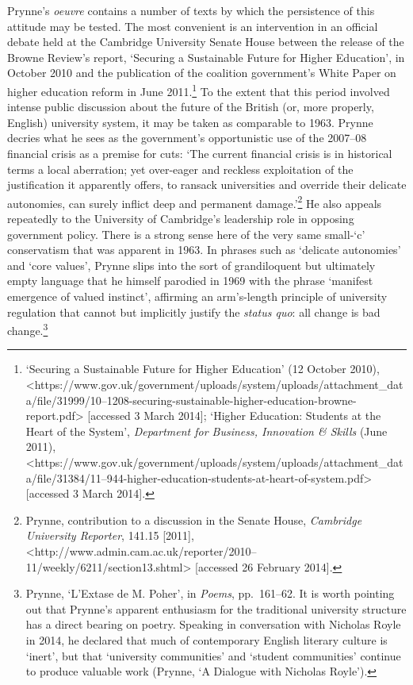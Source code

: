 \documentclass[]{article}
\begin{document}
Prynne's \emph{oeuvre} contains a number of texts by which the
persistence of this attitude may be tested. The most convenient is an
intervention in an official debate held at the Cambridge University
Senate House between the release of the Browne Review's report,
`Securing a Sustainable Future for Higher Education', in October 2010
and the publication of the coalition government's White Paper on higher
education reform in June 2011.\footnote{`Securing a Sustainable Future
  for Higher Education' (12 October 2010),
  \textless{}https://www.gov.uk/government/uploads/system/uploads/attachment\_data/file/31999/10--1208-securing-sustainable-higher-education-browne-report.pdf\textgreater{}
  {[}accessed 3 March 2014{]}; `Higher Education: Students at the Heart
  of the System', \emph{Department for Business, Innovation \& Skills}
  (June 2011),
  \textless{}https://www.gov.uk/government/uploads/system/uploads/attachment\_data/file/31384/11--944-higher-education-students-at-heart-of-system.pdf\textgreater{}
  {[}accessed 3 March 2014{]}.} To the extent that this period involved
intense public discussion about the future of the British (or, more
properly, English) university system, it may be taken as comparable to
1963. Prynne decries what he sees as the government's opportunistic use
of the 2007--08 financial crisis as a premise for cuts: `The current
financial crisis is in historical terms a local aberration; yet
over-eager and reckless exploitation of the justification it apparently
offers, to ransack universities and override their delicate autonomies,
can surely inflict deep and permanent damage.'\footnote{Prynne,
  contribution to a discussion in the Senate House, \emph{Cambridge
  University Reporter}, 141.15 {[}2011{]},
  \textless{}http://www.admin.cam.ac.uk/reporter/2010--11/weekly/6211/section13.shtml\textgreater{}
  {[}accessed 26 February 2014{]}.} He also appeals repeatedly to the
University of Cambridge's leadership role in opposing government policy.
There is a strong sense here of the very same small-`c' conservatism
that was apparent in 1963. In phrases such as `delicate autonomies' and
`core values', Prynne slips into the sort of grandiloquent but
ultimately empty language that he himself parodied in 1969 with the
phrase `manifest emergence \textbar{} of valued instinct', affirming an
arm's-length principle of university regulation that cannot but
implicitly justify the \emph{status quo}: all change is bad
change.\footnote{Prynne, `L'Extase de M. Poher', in \emph{Poems},
  pp.~161--62. It is worth pointing out that Prynne's apparent
  enthusiasm for the traditional university structure has a direct
  bearing on poetry. Speaking in conversation with Nicholas Royle in
  2014, he declared that much of contemporary English literary culture
  is `inert', but that `university communities' and `student
  communities' continue to produce valuable work (Prynne, `A Dialogue
  with Nicholas Royle').}
\end{document}
